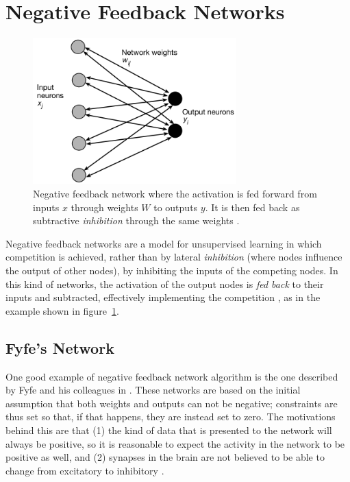 \documentclass[11pt,a4paper]{report}
\begin{document}
		\newpage		
		
		\section{Negative Feedback Networks}
			\label{sec:negfeedback}
			\begin{figure}[h]
				\centering
				\includegraphics[width=0.7\textwidth]{negfeedback}
				\caption{Negative feedback network where the activation is fed forward from inputs $x$ through weights $W$ to outputs $y$. It is then fed back as subtractive \emph{inhibition} through the same weights \cite{charles1998modelling}.}
				\label{fig:negfeedback}
			\end{figure}
			Negative feedback networks are a model for unsupervised learning in which competition is achieved, rather than by lateral \emph{inhibition} (where nodes influence the output of other nodes), by inhibiting the inputs of the competing nodes. In this kind of networks, the activation of the output nodes is \emph{fed back} to their inputs and subtracted, effectively implementing the competition \cite{spratling2009unsupervised}, as in the example shown in figure~\ref{fig:negfeedback}.
		
			\subsection{Fyfe's Network}
			One good example of negative feedback network algorithm is the one described by Fyfe and his colleagues in \cite{charles1997discovering,charles1998modelling,charles2002unsupervised,fyfe1997neural}. These networks are based on the initial assumption that both weights and outputs can not be negative; constraints are thus set so that, if that happens, they are instead set to zero. The motivations behind this are that (1) the kind of data that is presented to the network will always be positive, so it is reasonable to expect the activity in the network to be positive as well, and (2) synapses in the brain are not believed to be able to change from excitatory to inhibitory \cite{charles1998modelling}.
\end{document}
